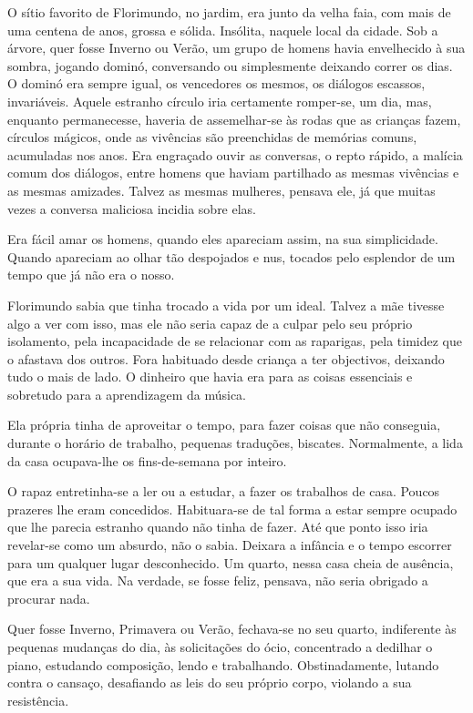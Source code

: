 O sítio favorito de Florimundo, no jardim, era junto da velha faia, com
mais de uma centena de anos, grossa e sólida. Insólita, naquele local da
cidade. Sob a árvore, quer fosse Inverno ou Verão, um grupo de homens
havia envelhecido à sua sombra, jogando dominó, conversando ou
simplesmente deixando correr os dias. O dominó era sempre igual, os
vencedores os mesmos, os diálogos escassos, invariáveis. Aquele estranho
círculo iria certamente romper-se, um dia, mas, enquanto permanecesse,
haveria de assemelhar-se às rodas que as crianças fazem, círculos
mágicos, onde as vivências são preenchidas de memórias comuns,
acumuladas nos anos. Era engraçado ouvir as conversas, o repto rápido, a
malícia comum dos diálogos, entre homens que haviam partilhado as mesmas
vivências e as mesmas amizades. Talvez as mesmas mulheres, pensava ele,
já que muitas vezes a conversa maliciosa incidia sobre elas.

Era fácil amar os homens, quando eles apareciam assim, na sua
simplicidade. Quando apareciam ao olhar tão despojados e nus, tocados
pelo esplendor de um tempo que já não era o nosso.

Florimundo sabia que tinha trocado a vida por um ideal. Talvez a mãe
tivesse algo a ver com isso, mas ele não seria capaz de a culpar pelo
seu próprio isolamento, pela incapacidade de se relacionar com as
raparigas, pela timidez que o afastava dos outros. Fora habituado desde
criança a ter objectivos, deixando tudo o mais de lado. O dinheiro que
havia era para as coisas essenciais e sobretudo para a aprendizagem da
música.

Ela própria tinha de aproveitar o tempo, para fazer coisas que não
conseguia, durante o horário de trabalho, pequenas traduções, biscates.
Normalmente, a lida da casa ocupava-lhe os fins-de-semana por inteiro.

O rapaz entretinha-se a ler ou a estudar, a fazer os trabalhos de casa.
Poucos prazeres lhe eram concedidos. Habituara-se de tal forma a estar
sempre ocupado que lhe parecia estranho quando não tinha de fazer. Até
que ponto isso iria revelar-se como um absurdo, não o sabia. Deixara a
infância e o tempo escorrer para um qualquer lugar desconhecido. Um
quarto, nessa casa cheia de ausência, que era a sua vida. Na verdade, se
fosse feliz, pensava, não seria obrigado a procurar nada.

Quer fosse Inverno, Primavera ou Verão, fechava-se no seu quarto,
indiferente às pequenas mudanças do dia, às solicitações do ócio,
concentrado a dedilhar o piano, estudando composição, lendo e
trabalhando. Obstinadamente, lutando contra o cansaço, desafiando as
leis do seu próprio corpo, violando a sua resistência.

